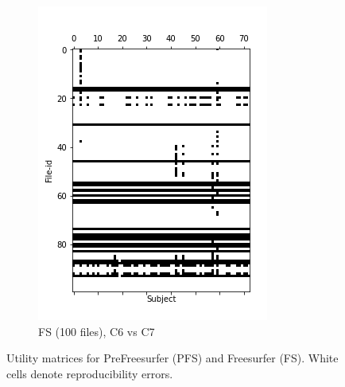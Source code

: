 \documentclass[10pt, conference, compsocconf]{IEEEtran}
\begin{document}
\begin{figure}[h!]
\begin{subfigure}[b]{0.45\columnwidth}
        \includegraphics[width=\columnwidth]{data/Utility_Matrix/FS-100files/FS-First-bound-100files.png}
  \caption{FS (100 files), C6 vs C7}
  \end{subfigure}
  \caption{Utility matrices for PreFreesurfer (PFS) and Freesurfer (FS). White cells denote reproducibility errors.}
    \label{fig:utility-matrices}
\end{figure}
\end{document}

